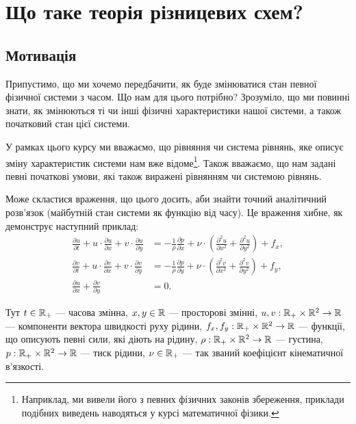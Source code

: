 \chapter{Що таке теорія різницевих схем?}

\section{Мотивація}

Припустимо, що ми хочемо передбачити, як буде змінюватися стан певної фізичної системи з часом. Що нам для цього потрібно? Зрозуміло, що ми повинні знати, як змінюються ті чи інші фізичні характеристики нашої системи, а також початковий стан цієї системи. \medskip

У рамках цього курсу ми вважаємо, що рівняння чи система рівнянь, яке описує зміну характеристик системи нам вже відоме\footnote{Наприклад, ми вивели його з певних фізичних законів збереження, приклади подібних виведень наводяться у курсі математичної фізики.}. Також вважаємо, що нам задані певні початкові умови, які також виражені рівнянням чи системою рівнянь. \medskip

Може скластися враження, що цього досить, аби знайти точний аналітичний розв'язок (майбутній стан системи як функцію від часу). Це враження хибне, як демонструє наступний приклад:
\begin{align}
    \frac{\partial u}{\partial t} + u \cdot \frac{\partial u}{\partial x} + v \cdot \frac{\partial u}{\partial y} &= - \frac{1}{\rho} \frac{\partial p}{\partial x} + \nu \cdot \left( \frac{\partial^2 u}{\partial x^2} + \frac{\partial^2 u}{\partial y^2} \right) + f_x, \\
    \frac{\partial v}{\partial t} + u \cdot \frac{\partial v}{\partial x} + v \cdot \frac{\partial v}{\partial y} &= - \frac{1}{\rho} \frac{\partial p}{\partial y} + \nu \cdot \left( \frac{\partial^2 v}{\partial x^2} + \frac{\partial^2 v}{\partial y^2} \right) + f_y, \\
    \frac{\partial u}{\partial x} + \frac{\partial v}{\partial y} &= 0.
\end{align}

Тут $t \in \mathbb{R}_+$ --- часова змінна, $x, y \in \mathbb{R}$ --- просторові змінні, $u, v: \mathbb{R}_+ \times \mathbb{R}^2 \to \mathbb{R}$ --- компоненти вектора швидкості руху рідини, $f_x, f_y: \mathbb{R}_+ \times \mathbb{R}^2 \to \mathbb{R}$ --- функції, що описують певні сили, які діють на рідину, $\rho: \mathbb{R}_+ \times \mathbb{R}^2 \to \mathbb{R}$ --- густина, $p: \mathbb{R}_+ \times \mathbb{R}^2 \to \mathbb{R}$ --- тиск рідини, $\nu \in \mathbb{R}_+$ --- так званий коефіцієнт кінематичної в'язкості. \medskip

